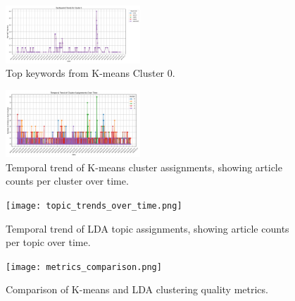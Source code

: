 \documentclass[conference]{IEEEtran}
\begin{document}
\begin{figure}[t]
    \centering
    \includegraphics[width=0.45\textwidth]{cluster_0_keywords.png}
    \caption{Top keywords from K-means Cluster 0.}
    \label{fig:cluster0-keywords}
\end{figure}

\begin{figure}[t]
    \centering
    \includegraphics[width=0.45\textwidth]{cluster_trends_over_time.png}
    \caption{Temporal trend of K-means cluster assignments, showing article counts per cluster over time.}
    \label{fig:cluster-trends}
\end{figure}

\begin{figure}[t]
    \centering
    \texttt{[image: topic\_trends\_over\_time.png]}
    \caption{Temporal trend of LDA topic assignments, showing article counts per topic over time.}
    \label{fig:topic-trends}
\end{figure}

\begin{figure}[t]
    \centering
    \texttt{[image: metrics\_comparison.png]}
    \caption{Comparison of K-means and LDA clustering quality metrics.}
    \label{fig:metrics-comparison}
\end{figure}
\end{document}
